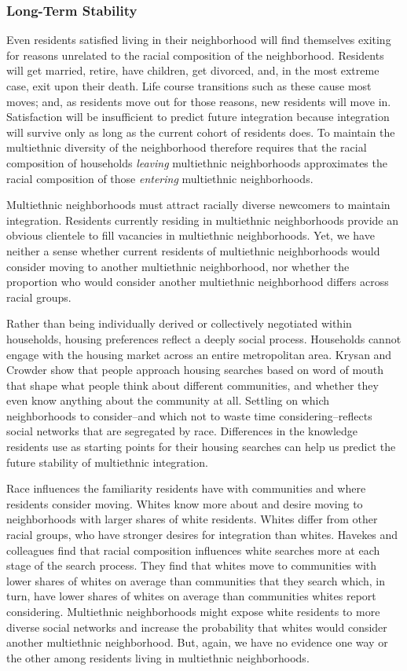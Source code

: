 \documentclass{baderart}
\begin{document}
\subsubsection{Long-Term Stability}\label{long-term-stability}

Even residents satisfied living in their neighborhood will find
themselves exiting for reasons unrelated to the racial composition of
the neighborhood. Residents will get married, retire, have children, get
divorced, and, in the most extreme case, exit upon their death. Life
course transitions such as these cause most moves; and, as residents
move out for those reasons, new residents will move in. Satisfaction
will be insufficient to predict future integration because integration
will survive only as long as the current cohort of residents does. To
maintain the multiethnic diversity of the neighborhood therefore
requires that the racial composition of households \emph{leaving}
multiethnic neighborhoods approximates the racial composition of those
\emph{entering} multiethnic neighborhoods.

Multiethnic neighborhoods must attract racially diverse newcomers to
maintain integration. Residents currently residing in multiethnic
neighborhoods provide an obvious clientele to fill vacancies in
multiethnic neighborhoods. Yet, we have neither a sense whether current
residents of multiethnic neighborhoods would consider moving to another
multiethnic neighborhood, nor whether the proportion who would consider
another multiethnic neighborhood differs across racial groups.

Rather than being individually derived or collectively negotiated within
households, housing preferences reflect a deeply social process.
Households cannot engage with the housing market across an entire
metropolitan area. Krysan and Crowder show that people approach housing
searches based on word of mouth that shape what people think about
different communities, and whether they even know anything about the
community at all. Settling on which neighborhoods to consider--and which
not to waste time considering--reflects social networks that are
segregated by race. Differences in the knowledge residents use as
starting points for their housing searches can help us predict the
future stability of multiethnic integration.

Race influences the familiarity residents have with communities and
where residents consider moving. Whites know more about and desire
moving to neighborhoods with larger shares of white residents. Whites
differ from other racial groups, who have stronger desires for
integration than whites. Havekes and colleagues find that racial
composition influences white searches more at each stage of the search
process. They find that whites move to communities with lower shares of
whites on average than communities that they search which, in turn, have
lower shares of whites on average than communities whites report
considering. Multiethnic neighborhoods might expose white residents to
more diverse social networks and increase the probability that whites
would consider another multiethnic neighborhood. But, again, we have no
evidence one way or the other among residents living in multiethnic
neighborhoods.
\end{document}
